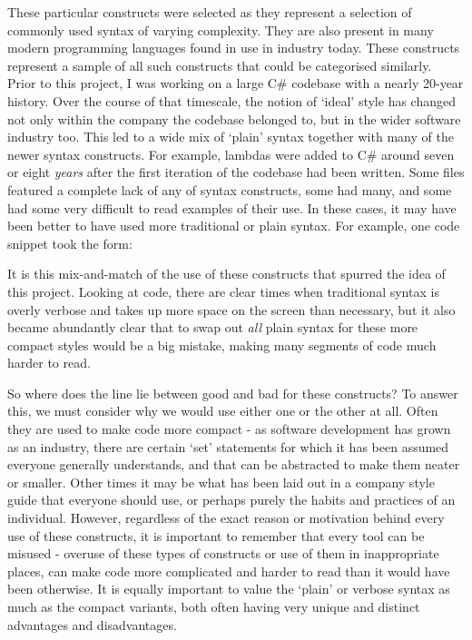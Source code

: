 \documentclass{article}
\begin{document}
        These particular constructs were selected as they represent a selection of commonly used syntax of varying complexity. They are also present in many modern programming languages found in use in industry today. These constructs represent a sample of all such constructs that could be categorised similarly.
        \\
        Prior to this project, I was working on a large C\# codebase with a nearly 20-year history. Over the course of that timescale, the notion of `ideal' style has changed not only within the company the codebase belonged to, but in the wider software industry too. This led to a wide mix of `plain' syntax together with many of the newer syntax constructs. For example, lambdas were added to C\# around seven or eight \emph{years} after the first iteration of the codebase had been written. Some files featured a complete lack of any of syntax constructs, some had many,  and some had some very difficult to read examples of their use. In these cases, it may have been better to have used more traditional or plain syntax. For example, one code snippet took the form:\newline

        \newline
        \indent\indent{}\newline
        \indent\indent{}\newline
        \indent\indent{}\newline
        

        It is this mix-and-match of the use of these constructs that spurred the idea of this project. Looking at code, there are clear times when traditional syntax is overly verbose and takes up more space on the screen than necessary, but it also became abundantly clear that to swap out \emph{all} plain syntax for these more compact styles would be a big mistake, making many segments of code much harder to read.

        So where does the line lie between good and bad for these constructs? To answer this, we must consider why we would use either one or the other at all. Often they are used to make code more compact - as software development has grown as an industry, there are certain `set' statements for which it has been assumed everyone generally understands, and that can be abstracted to make them neater or smaller. Other times it may be what has been laid out in a company style guide that everyone should use, or perhaps purely the habits and practices of an individual. However, regardless of the exact reason or motivation behind every use of these constructs, it is important to remember that every tool can be misused - overuse of these types of constructs or use of them in inappropriate places, can make code more complicated and harder to read than it would have been otherwise. It is equally important to value the `plain' or verbose syntax as much as the compact variants, both often having very unique and distinct advantages and disadvantages.
        \\
\end{document}
